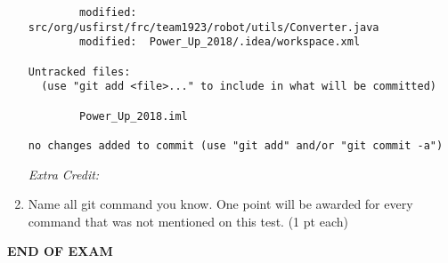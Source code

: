 \documentclass[11pt,fleqn]{article}
\begin{document}
\begin{enumerate}
\begin{verbatim}
        modified:  src/org/usfirst/frc/team1923/robot/utils/Converter.java
        modified:  Power_Up_2018/.idea/workspace.xml

Untracked files:
  (use "git add <file>..." to include in what will be committed)

        Power_Up_2018.iml

no changes added to commit (use "git add" and/or "git commit -a")
\end{verbatim}


\vspace{15ex}


\textit{Extra Credit:} %
    \item Name all git command you know. One point will be awarded for every command that was not mentioned on this test. (1 pt each)
\vspace{16ex}

\end{enumerate}
\vfill
	\begin{center}
		\textbf{END OF EXAM}
	\end{center}
\end{document}
